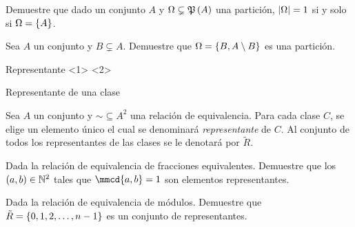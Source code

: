 \begin{frame}
	
\end{frame}
\begin{frame}
	\begin{exercise}
		Demuestre que dado un conjunto $ A $ y $ \Omega\subsetneq\mpow{A} $ una partición, $ \abs{\Omega} = 1 $ si y solo si $ \Omega =\set{A} $.
	\end{exercise}
\end{frame}
\begin{frame}
	
\end{frame}
\begin{frame}
	\begin{exercise}
		Sea $ A $ un conjunto y $ B\subsetneq A $. Demuestre que $ \Omega =\set{B, A\setminus B} $ es una partición.
	\end{exercise}
\end{frame}
\begin{frame}
	
\end{frame}
\begin{frame}{Representante}
\end{frame}
\begin{frame}{Representante de una clase}
	\begin{mdefinition}[Representante]
		Sea $ A $ un conjunto y $ \sim\subseteq A^{2} $ una relación de equivalencia. Para cada clase $ C $, se elige un elemento único el cual se denominará \emph{representante} de $ C $. Al conjunto de todos los representantes de las clases se le denotará por $ \tilde{R} $.
	\end{mdefinition}
\end{frame}
\begin{frame}
	\begin{exercise}
		Dada la relación de equivalencia de fracciones equivalentes. Demuestre que los $ (a, b)\in\nmath[2] $ tales que $ \mmcd{a, b} = 1 $ son elementos representantes.
	\end{exercise}
\end{frame}
\begin{frame}
	
\end{frame}
\begin{frame}
	\begin{exercise}
		Dada la relación de equivalencia de módulos. Demuestre que $ \tilde{R} =\set{0, 1, 2,\dotsc, n - 1} $ es un conjunto de representantes.
	\end{exercise}
\end{frame}
\begin{frame}
	
\end{frame}